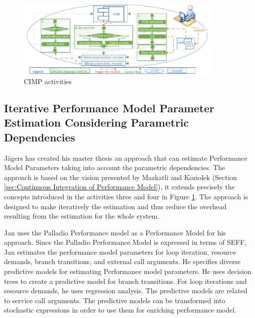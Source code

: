 \begin{figure}[h]
\centering
\includegraphics[width=0.9\textwidth]{figures/cipm}
\caption{CIMP activities \cite{mazkatli2018continuous}}
\label{fig:CIMP activities}
\end{figure} 

\subsection{Iterative Performance Model Parameter Estimation Considering Parametric Dependencies}
\label{sec:Iterative Performance Model Parameter Estimation Considering Parametric Dependencies}
Jägers has created his master thesis \cite{jagers2018Iterative} an approach that can estimate Performance Model Parameters taking into account the parametric dependencies. The approach is based on the vision presented by Mazkatli and Koziolek (Section \ref{sec:Continuous Integration of Performance Model}), it extends precisely the concepts introduced in the activities three and four in Figure \ref{fig:CIMP activities}. The approach is designed to make iteratively the estimation and thus reduce the overhead resulting from the estimation for the whole system. 

Jan uses the Palladio Performance model as a Performance Model for his approach. Since the Palladio Performance Model is expressed in terms of SEFF, Jan estimates the performance model parameters for loop iteration, resource demands, branch transitions, and external call arguments. He specifies diverse predictive models for estimating Performance model parameters. He uses decision trees to create a predictive model for branch transitions. For loop iterations and resource demands, he uses regression analysis. The predictive models are related to service call arguments. The predictive models can be transformed into stochastic expressions in order to use them for enriching performance model.

